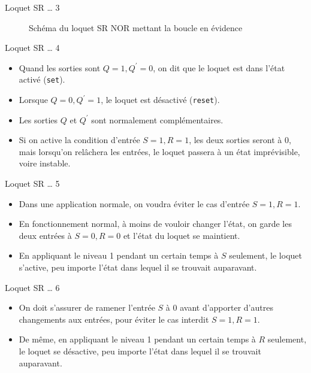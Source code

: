 \documentclass[presentation]{beamer}
\begin{document}
\begin{frame}[label={sec:orge053252}]{Loquet SR \ldots{} 3}
\begin{figure}[htbp]
\centering

\caption{\label{fig:org2d75ed6}Schéma du loquet SR NOR mettant la boucle en évidence}
\end{figure}
\end{frame}

\begin{frame}[label={sec:orgd7fd623},fragile]{Loquet SR \ldots{} 4}
 \begin{itemize}
\item Quand les sorties sont \(Q=1, Q^\prime=0\), on dit que le loquet est dans l'état activé (\texttt{set}).

\item Lorsque \(Q=0, Q^\prime=1\), le loquet est désactivé (\texttt{reset}).

\item Les sorties \(Q\) et \(Q^\prime\) sont normalement complémentaires.

\item Si on active la condition d'entrée \(S=1, R=1\), les deux sorties seront à 0, mais lorsqu'on relâchera les entrées, le loquet passera à un état imprévisible, voire instable.
\end{itemize}
\end{frame}

\begin{frame}[label={sec:orgdd73a98}]{Loquet SR \ldots{} 5}
\begin{itemize}
\item Dans une application normale, on voudra éviter le cas d'entrée \(S=1, R=1\).

\item En fonctionnement normal, à moins de vouloir changer l'état, on garde les deux entrées à \(S=0, R=0\) et l'état du loquet se maintient.

\item En appliquant le niveau 1 pendant un certain temps à \(S\) seulement, le loquet s'active, peu importe l'état dans lequel il se trouvait auparavant.
\end{itemize}
\end{frame}

\begin{frame}[label={sec:orga9a35c3}]{Loquet SR \ldots{} 6}
\begin{itemize}
\item On doit s'assurer de ramener l'entrée \(S\) à 0 avant d'apporter d'autres changements aux entrées, pour éviter le cas interdit \(S=1, R=1\).

\item De même, en appliquant le niveau 1 pendant un certain temps à \(R\) seulement, le loquet se désactive, peu importe l'état dans lequel il se trouvait auparavant.
\end{itemize}
\end{frame}
\end{document}
